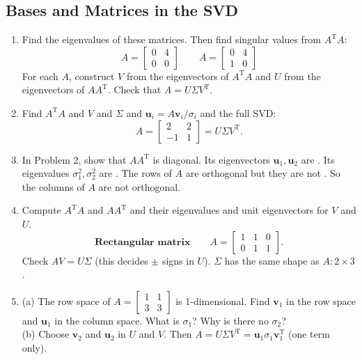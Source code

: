 \documentclass[14pt, a4paper]{article}
\begin{document}
\subsection{Bases and Matrices in the SVD}
\begin{enumerate}
    \item Find the eigenvalues of these matrices. Then find singular values from $A^{\mathrm{T}}A$:
          \[
              A = \begin{bmatrix} 0 & 4 \\ 0 & 0 \end{bmatrix} \qquad A = \begin{bmatrix} 0 & 4 \\ 1 & 0 \end{bmatrix}
          \]
          For each $A$, construct $V$ from the eigenvectors of $A^{\mathrm{T}}A$ and $U$ from the eigenvectors of $AA^{\mathrm{T}}$. Check that $A = U\Sigma V^{\mathrm{T}}$.

    \item Find $A^{\mathrm{T}}A$ and $V$ and $\Sigma$ and $\boldsymbol{u}_i = A\boldsymbol{v}_i/\sigma_i$ and the full SVD:
          \[
              A = \begin{bmatrix} 2 & 2 \\ -1 & 1 \end{bmatrix} = U\Sigma V^{\mathrm{T}}.
          \]

    \item In Problem 2, show that $AA^{\mathrm{T}}$ is diagonal. Its eigenvectors $\boldsymbol{u}_1, \boldsymbol{u}_2$ are \underline{\hspace{1cm}}. Its eigenvalues $\sigma_1^2, \sigma_2^2$ are \underline{\hspace{1cm}}. The rows of $A$ are orthogonal but they are not \underline{\hspace{1cm}}. So the columns of $A$ are not orthogonal.

    \item Compute $A^{\mathrm{T}}A$ and $AA^{\mathrm{T}}$ and their eigenvalues and unit eigenvectors for $V$ and $U$.
          \[
              \textbf{Rectangular matrix} \qquad A = \begin{bmatrix} 1 & 1 & 0 \\ 0 & 1 & 1 \end{bmatrix}.
          \]
          Check $AV = U\Sigma$ (this decides $\pm$ signs in $U$). $\Sigma$ has the same shape as $A: 2 \times 3$.

    \item (a) The row space of $A = \begin{bmatrix} 1 & 1 \\ 3 & 3 \end{bmatrix}$ is 1-dimensional. Find $\boldsymbol{v}_1$ in the row space and $\boldsymbol{u}_1$ in the column space. What is $\sigma_1$? Why is there no $\sigma_2$? \\
          (b) Choose $\boldsymbol{v}_2$ and $\boldsymbol{u}_2$ in $U$ and $V$. Then $A = U\Sigma V^{\mathrm{T}} = \boldsymbol{u}_1\sigma_1\boldsymbol{v}_1^{\mathrm{T}}$ (one term only).


\end{enumerate}
\end{document}
